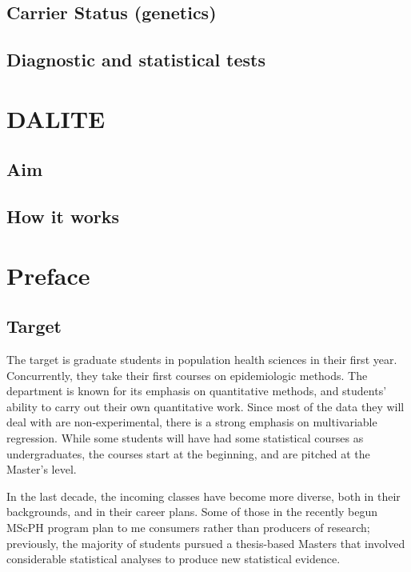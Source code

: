 \documentclass[]{book}
\begin{document}
\hypertarget{carrier-status-genetics}{%
\section{Carrier Status (genetics)}\label{carrier-status-genetics}}

\hypertarget{diagnostic-and-statistical-tests}{%
\section{Diagnostic and statistical tests}\label{diagnostic-and-statistical-tests}}

\hypertarget{dalite}{%
\chapter{DALITE}\label{dalite}}

\hypertarget{aim}{%
\section{Aim}\label{aim}}

\hypertarget{how-it-works}{%
\section{How it works}\label{how-it-works}}

\hypertarget{preface-1}{%
\chapter*{Preface}\label{preface-1}}

\hypertarget{target-1}{%
\section{Target}\label{target-1}}

The target is graduate students in population health sciences in their first year. Concurrently, they take their first courses on epidemiologic methods. The department is known for its emphasis on quantitative methods, and students' ability to carry out their own quantitative work. Since most of the data they will deal with are non-experimental, there is a strong emphasis on multivariable regression. While some students will have had some statistical courses as undergraduates, the courses start at the beginning, and are pitched at the Master's level.

In the last decade, the incoming classes have become more diverse, both in their backgrounds, and in their career plans. Some of those in the recently begun MScPH program plan to me consumers rather than producers of research; previously, the majority of students pursued a thesis-based Masters that involved considerable statistical analyses to produce new statistical evidence.
\end{document}
